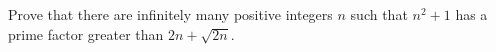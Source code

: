 Prove that there are infinitely many positive integers $n$
such that $n^2+1$ has a prime factor greater than $2n + \sqrt{2n}$.